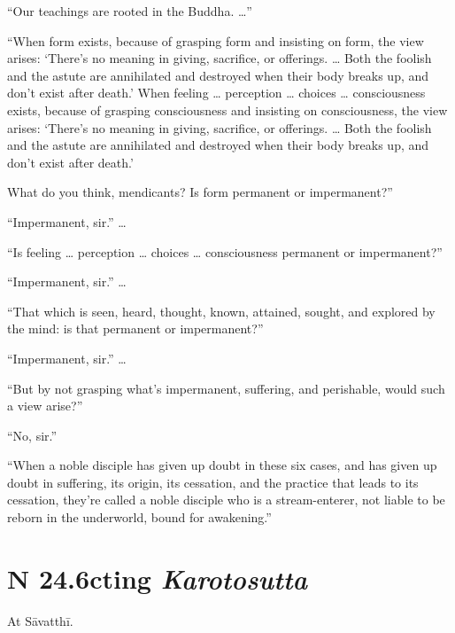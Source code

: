 \documentclass[12pt,openany]{book}%
\newcommand*{\suttatitleacronym}[1]{\smaller[2]{#1}\vspace*{.3em}}
\newcommand*{\suttatitletranslation}[1]{\linebreak{#1}}
\newcommand*{\suttatitleroot}[1]{\linebreak\smaller[2]\itshape{#1}}
\newcommand*{\tocacronym}[1]{\hspace*{-3.3em}{#1}\quad}
\newcommand*{\toctranslation}[1]{#1}
\newcommand*{\tocroot}[1]{(\textit{#1})}
\begin{document}
“Our teachings are rooted in the Buddha. …” 

“When form exists, because of grasping form and insisting on form, the view arises: ‘There’s no meaning in giving, sacrifice, or offerings. … Both the foolish and the astute are annihilated and destroyed when their body breaks up, and don’t exist after death.’ When feeling … perception … choices … consciousness exists, because of grasping consciousness and insisting on consciousness, the view arises: ‘There’s no meaning in giving, sacrifice, or offerings. … Both the foolish and the astute are annihilated and destroyed when their body breaks up, and don’t exist after death.’ 

What do you think, mendicants? Is form permanent or impermanent?” 

“Impermanent, sir.” … 

“Is feeling … perception … choices … consciousness permanent or impermanent?” 

“Impermanent, sir.” … 

“That which is seen, heard, thought, known, attained, sought, and explored by the mind: is that permanent or impermanent?” 

“Impermanent, sir.” … 

“But by not grasping what’s impermanent, suffering, and perishable, would such a view arise?” 

“No, sir.” 

“When a noble disciple has given up doubt in these six cases, and has given up doubt in suffering, its origin, its cessation, and the practice that leads to its cessation, they’re called a noble disciple who is a stream-enterer, not liable to be reborn in the underworld, bound for awakening.” 

%
\section*{{\suttatitleacronym SN 24.6}{\suttatitletranslation Acting }{\suttatitleroot Karotosutta}}
\addcontentsline{toc}{section}{\tocacronym{SN 24.6} \toctranslation{Acting } \tocroot{Karotosutta}}

At \textsanskrit{Sāvatthī}. 
\end{document}
